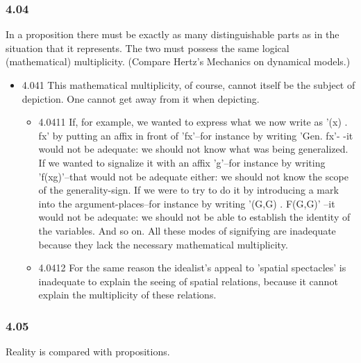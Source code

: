 \documentclass[11pt]{article}
\begin{document}
\subsubsection*{4.04}
\label{sec:org927354b}
In a proposition there must be exactly as many distinguishable parts
as in the situation that it represents. The two must possess the same
logical (mathematical) multiplicity. (Compare Hertz's Mechanics on
dynamical models.)
\begin{itemize}
\item 4.041
\label{sec:orgc333543}
This mathematical multiplicity, of course, cannot itself be the
subject of depiction. One cannot get away from it when depicting.
\begin{itemize}
\item 4.0411
\label{sec:org262e262}
If, for example, we wanted to express what we now write as '(x) .
fx' by putting an affix in front of 'fx'--for instance by writing 'Gen. fx'-
-it would not be adequate: we should not know what was being generalized.
If we wanted to signalize it with an affix 'g'--for instance by writing
'f(xg)'--that would not be adequate either: we should not know the scope of
the generality-sign. If we were to try to do it by introducing a mark into
the argument-places--for instance by writing '(G,G) . F(G,G)' --it would
not be adequate: we should not be able to establish the identity of the
variables. And so on. All these modes of signifying are inadequate because
they lack the necessary mathematical multiplicity.
\item 4.0412
\label{sec:orgddd83fe}
For the same reason the idealist's appeal to 'spatial spectacles' is
inadequate to explain the seeing of spatial relations, because it cannot
explain the multiplicity of these relations.
\end{itemize}
\end{itemize}
\subsubsection*{4.05}
\label{sec:org4daa67b}
Reality is compared with propositions.
\end{document}
